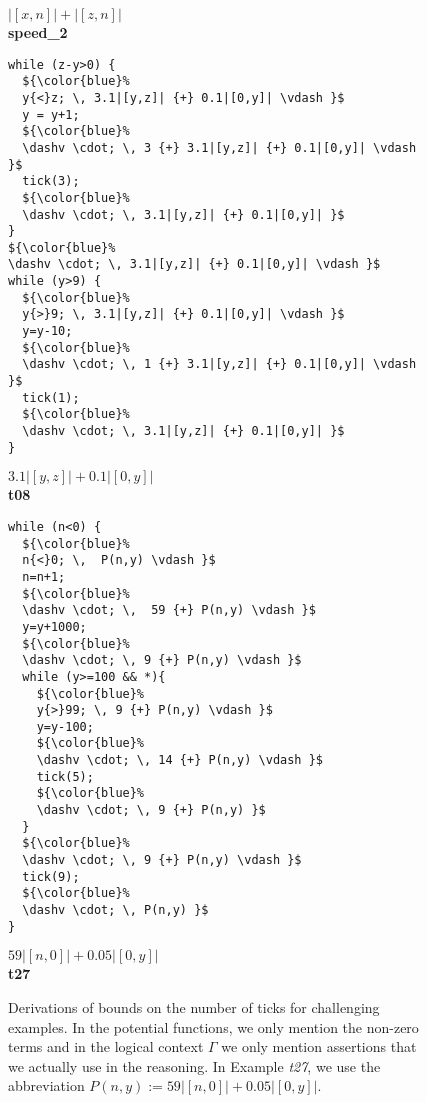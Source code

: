 \documentclass[nocopyrightspace,preprint]{sigplanconf}
\begin{document}
\begin{figure*}[t!]
\begin{minipage}[b]{\progwidth}
\begin{center}
$|[x, n]| + |[z, n]|$
\\[.7\baselineskip]
      {\bf speed\_2}
    \end{center}
  \end{minipage}
%
\hfill
%
  \begin{minipage}[b]{\progwidth}
    \begin{center}
   \begin{lstlisting}
while (z-y>0) {
  ${\color{blue}%
  y{<}z; \, 3.1|[y,z]| {+} 0.1|[0,y]| \vdash }$
  y = y+1;
  ${\color{blue}%
  \dashv \cdot; \, 3 {+} 3.1|[y,z]| {+} 0.1|[0,y]| \vdash }$
  tick(3);
  ${\color{blue}%
  \dashv \cdot; \, 3.1|[y,z]| {+} 0.1|[0,y]| }$
}
${\color{blue}%
\dashv \cdot; \, 3.1|[y,z]| {+} 0.1|[0,y]| \vdash }$
while (y>9) {
  ${\color{blue}%
  y{>}9; \, 3.1|[y,z]| {+} 0.1|[0,y]| \vdash }$
  y=y-10;
  ${\color{blue}%
  \dashv \cdot; \, 1 {+} 3.1|[y,z]| {+} 0.1|[0,y]| \vdash }$
  tick(1);
  ${\color{blue}%
  \dashv \cdot; \, 3.1|[y,z]| {+} 0.1|[0,y]| }$
}
   \end{lstlisting}

$3.1|[y,z]| + 0.1|[0,y]|$
\\[.7\baselineskip] 
      {\bf t08}
    \end{center}
  \end{minipage}
%
\hfill
%
%
%
  \begin{minipage}[b]{\progwidth}
    \begin{center}
   \begin{lstlisting}
while (n<0) {
  ${\color{blue}%
  n{<}0; \,  P(n,y) \vdash }$
  n=n+1;
  ${\color{blue}%
  \dashv \cdot; \,  59 {+} P(n,y) \vdash }$
  y=y+1000;
  ${\color{blue}%
  \dashv \cdot; \, 9 {+} P(n,y) \vdash }$
  while (y>=100 && *){
    ${\color{blue}%
    y{>}99; \, 9 {+} P(n,y) \vdash }$
    y=y-100;
    ${\color{blue}%
    \dashv \cdot; \, 14 {+} P(n,y) \vdash }$
    tick(5);
    ${\color{blue}%
    \dashv \cdot; \, 9 {+} P(n,y) }$
  }
  ${\color{blue}%
  \dashv \cdot; \, 9 {+} P(n,y) \vdash }$
  tick(9);
  ${\color{blue}%
  \dashv \cdot; \, P(n,y) }$
}
   \end{lstlisting}
$59|[n,0]| {+} 0.05|[0,y]|$
\\[.7\baselineskip]
      {\bf t27}
    \end{center}
  \end{minipage}

  \caption{Derivations of bounds on the number of ticks for
    challenging examples.  In the potential functions, we only mention
    the non-zero terms and in the logical context $\Gamma$ we only
    mention assertions that we actually use in the reasoning. In
    Example \emph{t27}, we use the abbreviation $P(n,y) := 59|[n,0]|
    {+} 0.05|[0,y]|$.}
  \label{fig:ex_list}
\end{figure*}
\end{document}
